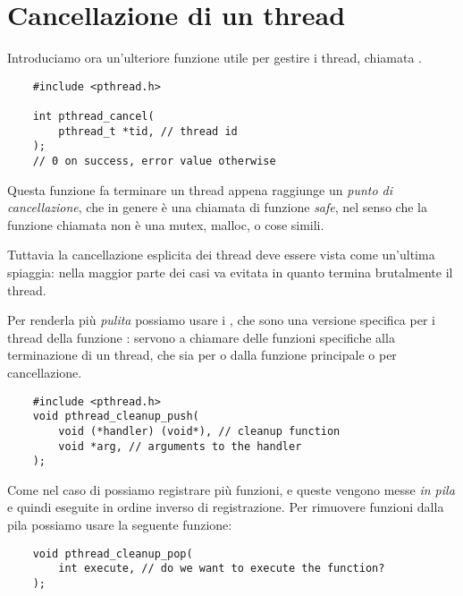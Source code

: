 \section{Cancellazione di un thread}

Introduciamo ora un'ulteriore funzione utile per gestire i thread, chiamata .

\begin{verbatim}
    #include <pthread.h>

    int pthread_cancel(
        pthread_t *tid, // thread id
    );
    // 0 on success, error value otherwise
\end{verbatim}

Questa funzione fa terminare un thread appena raggiunge un \emph{punto di cancellazione}, che in genere è una chiamata di funzione \emph{safe}, nel senso che la funzione chiamata non è una mutex, malloc, o cose simili.

Tuttavia la cancellazione esplicita dei thread deve essere vista come un'ultima spiaggia: nella maggior parte dei casi va evitata in quanto termina brutalmente il thread.

Per renderla più \emph{pulita} possiamo usare i , che sono una versione specifica per i thread della funzione : servono a chiamare delle funzioni specifiche alla terminazione di un thread, che sia per  o  dalla funzione principale o per cancellazione.

\begin{verbatim}
    #include <pthread.h>
    void pthread_cleanup_push(
        void (*handler) (void*), // cleanup function
        void *arg, // arguments to the handler
    );
\end{verbatim}

Come nel caso di  possiamo registrare più funzioni, e queste vengono messe \emph{in pila} e quindi eseguite in ordine inverso di registrazione. Per rimuovere funzioni dalla pila possiamo usare la seguente funzione:
\begin{verbatim}
    void pthread_cleanup_pop(
        int execute, // do we want to execute the function?
    );
\end{verbatim}